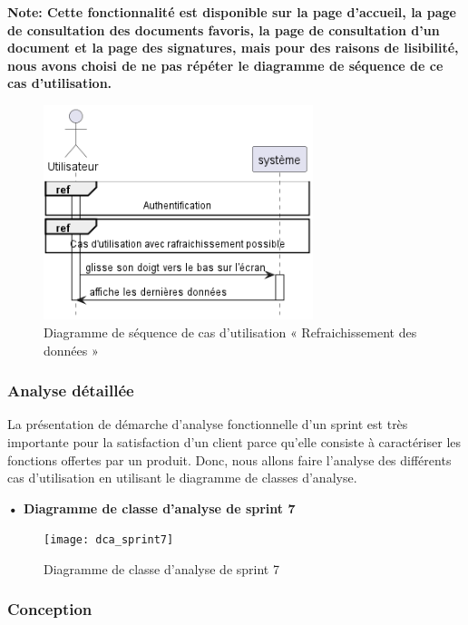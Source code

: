 \textbf{Note: Cette fonctionnalité est disponible sur la page d'accueil, la page de consultation des documents favoris, la page de consultation d'un document et la page des signatures, mais pour des raisons de lisibilité, nous avons choisi de ne pas répéter le diagramme de séquence de ce cas d'utilisation.}
\begin{figure}[H]
  \centering
  \includegraphics[width=0.7\textwidth]{out/diagrams/sprint7/refresh_data/refresh_data}
  \caption{Diagramme de séquence de cas d'utilisation « Refraichissement des données »}
  \label{fig:sequence_refresh_data}
\end{figure}


\subsubsection{Analyse détaillée}
La présentation de démarche d'analyse fonctionnelle d'un sprint est très importante pour la satisfaction d'un client parce qu'elle consiste à caractériser les fonctions offertes par un produit.
Donc, nous allons faire l'analyse des différents cas d'utilisation en utilisant le diagramme de classes d'analyse.


\setlength{\parskip}{1em}
\setlength{\parindent}{0em}

\textbf{•	Diagramme de classe d'analyse de sprint 7 }


\begin{figure}[H]
  \centering
  \texttt{[image: dca\_sprint7]}
  \caption{Diagramme de classe d'analyse de sprint 7}
  \label{fig:class_analyse_sprint7}
\end{figure}


\subsubsection{Conception}

